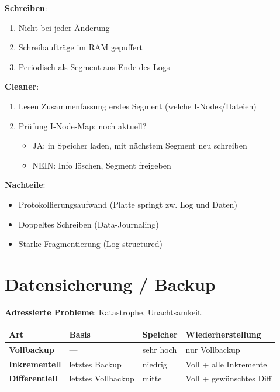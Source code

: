 \documentclass[11pt, a4paper]{article}
\begin{document}
\textbf{Schreiben}:

\begin{enumerate}
  \item Nicht bei jeder Änderung
  \item Schreibaufträge im RAM gepuffert
  \item Periodisch als Segment ans Ende des Logs
\end{enumerate}

\textbf{Cleaner}:

\begin{enumerate}
  \item Lesen Zusammenfassung erstes Segment (welche I-Nodes/Dateien)
  \item Prüfung I-Node-Map: noch aktuell?
\begin{itemize}
  \item JA: in Speicher laden, mit nächstem Segment neu schreiben
  \item NEIN: Info löschen, Segment freigeben
\end{itemize}
\end{enumerate}

\textbf{Nachteile}:

\begin{itemize}
  \item Protokollierungsaufwand (Platte springt zw. Log und Daten)
  \item Doppeltes Schreiben (Data-Journaling)
  \item Starke Fragmentierung (Log-structured)
\end{itemize}


\section{Datensicherung / Backup}

\textbf{Adressierte Probleme}: Katastrophe, Unachtsamkeit.



{\small
\begin{tabularx}{\linewidth}{XXXX}
\hline
\rowcolor{tableheadbg}
{\color{white}\textbf{Art}} & {\color{white}\textbf{Basis}} & {\color{white}\textbf{Speicher}} & {\color{white}\textbf{Wiederherstellung}} \\[2pt]
\hline
\endhead
\hline
\endfoot
\textbf{Vollbackup} & — & sehr hoch & nur Vollbackup \\
\textbf{Inkrementell} & letztes Backup & niedrig & Voll + alle Inkremente \\
\textbf{Differentiell} & letztes Vollbackup & mittel & Voll + gewünschtes Diff \\
\end{tabularx}
}
\end{document}
